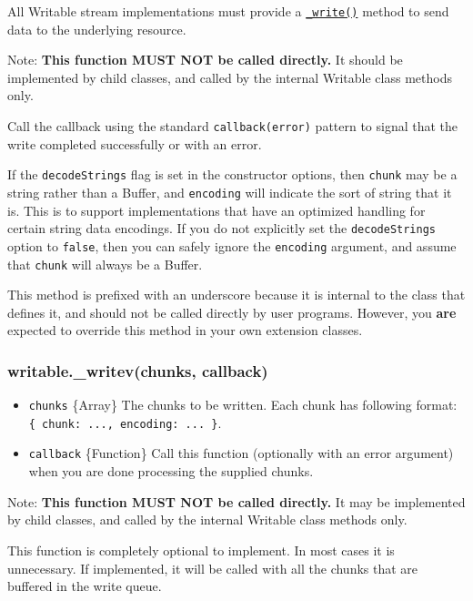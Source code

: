 All Writable stream implementations must provide a
\hyperref[streamux5fwritableux5fwriteux5fchunkux5fencodingux5fcallbackux5f1]{\texttt{\_write()}}
method to send data to the underlying resource.

Note: \textbf{This function MUST NOT be called directly.} It should be
implemented by child classes, and called by the internal Writable class
methods only.

Call the callback using the standard \texttt{callback(error)} pattern to
signal that the write completed successfully or with an error.

If the \texttt{decodeStrings} flag is set in the constructor options,
then \texttt{chunk} may be a string rather than a Buffer, and
\texttt{encoding} will indicate the sort of string that it is. This is
to support implementations that have an optimized handling for certain
string data encodings. If you do not explicitly set the
\texttt{decodeStrings} option to \texttt{false}, then you can safely
ignore the \texttt{encoding} argument, and assume that \texttt{chunk}
will always be a Buffer.

This method is prefixed with an underscore because it is internal to the
class that defines it, and should not be called directly by user
programs. However, you \textbf{are} expected to override this method in
your own extension classes.

\subsubsection{writable.\_writev(chunks,
callback)}\label{writable.ux5fwritevchunks-callback}

\begin{itemize}
\itemsep1pt\parskip0pt
\item
  \texttt{chunks} \{Array\} The chunks to be written. Each chunk has
  following format: \texttt{\{ chunk: ..., encoding: ... \}}.
\item
  \texttt{callback} \{Function\} Call this function (optionally with an
  error argument) when you are done processing the supplied chunks.
\end{itemize}

Note: \textbf{This function MUST NOT be called directly.} It may be
implemented by child classes, and called by the internal Writable class
methods only.

This function is completely optional to implement. In most cases it is
unnecessary. If implemented, it will be called with all the chunks that
are buffered in the write queue.

